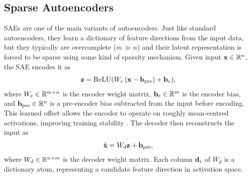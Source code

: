 %


\subsection{Sparse Autoencoders} \label{sec:background:ae:sae}

\Acfp{SAE} are one of the main variants of autoencoders. Just like standard
autoencoders, they learn a dictionary of feature directions from the input data,
but they typically are overcomplete ($m \gg n$) and their latent representation
is forced to be sparse using some kind of sparsity mechanism. Given input
$\vb{x} \in \mathbb{R}^{n}$, the \ac{SAE} encodes it as
\begin{equation} \label{eq:background:ae:sae:encode}
    \vb{z} = \operatorname{ReLU}(W_{e}\left(\vb{x} -
    \vb{b}_{\mathrm{pre}}\right) + \vb{b}_{e}),
\end{equation}
where $W_{e} \in \mathbb{R}^{m \times n}$ is the encoder weight matrix,
$\vb{b}_{e} \in \mathbb{R}^{m}$ is the encoder bias, and $\vb{b}_{\mathrm{pre}} \in
\mathbb{R}^{n}$ is a pre-encoder bias subtracted from the input before encoding. This
learned offset allows the encoder to operate on roughly mean-centred
activations, improving training stability
\cite{brickenMonosemanticityDecomposingLanguage2023}. The decoder then
reconstructs the input as
\begin{equation} \label{eq:background:ae:sae:decode}
    \hat{\vb{x}} = W_{d} \vb{z} + \vb{b}_{\mathrm{pre}},
\end{equation}
where $W_{d} \in \mathbb{R}^{n \times m}$ is the decoder weight matrix. Each column
$\vb{d}_{i}$ of $W_{d}$ is a dictionary atom, representing a candidate
feature direction in activation space.

